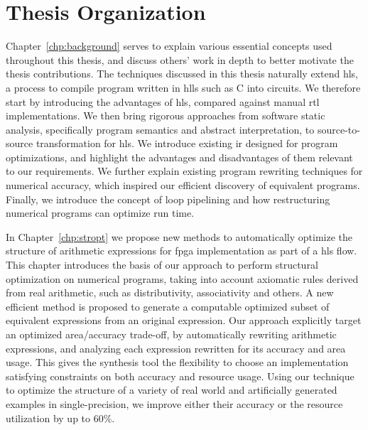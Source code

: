 \section{Thesis Organization}
\label{intro:sec:organization}

Chapter~\ref{chp:background} serves to explain various essential concepts used
throughout this thesis, and discuss others' work in depth to better motivate
the thesis contributions.  The techniques discussed in this thesis naturally
extend \gls{hls}, a process to compile program written in \glspl{hll} such
as C into circuits.  We therefore start by introducing the advantages of
\gls{hls}, compared against manual \gls{rtl} implementations.  We then bring
rigorous approaches from software static analysis, specifically program
semantics and abstract interpretation, to source-to-source transformation
for \gls{hls}\@.  We introduce existing \gls{ir} designed for program
optimizations, and highlight the advantages and disadvantages of them relevant
to our requirements.  We further explain existing program rewriting techniques
for numerical accuracy, which inspired our efficient discovery of equivalent
programs.  Finally, we introduce the concept of loop pipelining and how
restructuring numerical programs can optimize run time.

In Chapter~\ref{chp:stropt} we propose new methods to automatically optimize
the structure of arithmetic expressions for \gls{fpga} implementation as part
of a \gls{hls} flow.  This chapter introduces the basis of our approach to
perform structural optimization on numerical programs, taking into account
axiomatic rules derived from real arithmetic, such as distributivity,
associativity and others.  A new efficient method is proposed to generate
a computable optimized subset of equivalent expressions from an original
expression.  Our approach explicitly target an optimized area/accuracy
trade-off, by automatically rewriting arithmetic expressions, and analyzing
each expression rewritten for its accuracy and area usage.  This gives
the synthesis tool the flexibility to choose an implementation satisfying
constraints on both accuracy and resource usage.  Using our technique to
optimize the structure of a variety of real world and artificially generated
examples in single-precision, we improve either their accuracy or the resource
utilization by up to 60\%.

